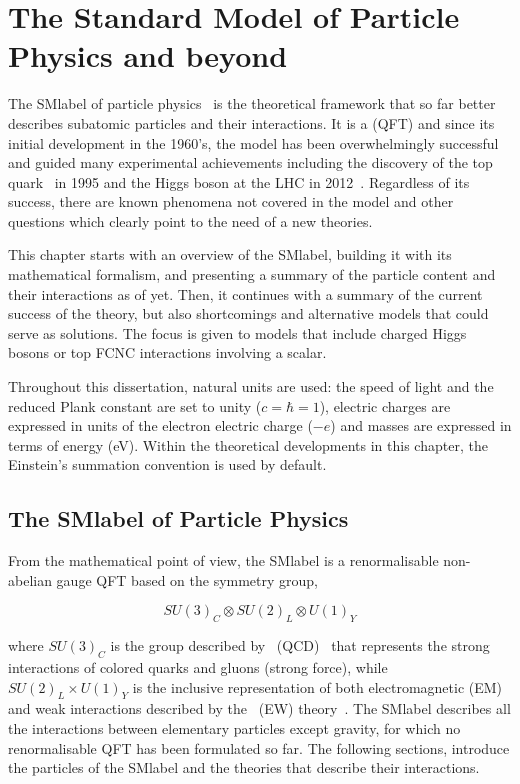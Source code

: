 \chapter{The Standard Model of Particle Physics and beyond}
\label{chapter:SM}

The \acrfull{SMlabel} of particle physics~\cite{PhysRevLett.19.1264,GLASHOW1961579,RevModPhys.52.525} is the theoretical framework
that so far better describes subatomic particles and their interactions.
It is a  (\acrshort{QFT}) and since its initial development in the 1960's,
the model has been overwhelmingly successful and guided many experimental achievements
including the discovery of the top quark~\cite{topsearch1995,PhysRevLett.74.2626} in 1995
and the Higgs boson at the LHC in 2012~\cite{ATLASHiggs2012,CMShiggs2012}.
Regardless of its success, there are known phenomena not covered in the model
and other questions which clearly point to the need of a new theories.

This chapter starts with an overview of the \acrshort{SMlabel}, building it with its mathematical formalism, and presenting a summary of the particle content and their interactions as of yet. Then, it continues with a summary of the current success of the theory, but also shortcomings and alternative models that could serve as solutions. The focus is given to models that include charged Higgs bosons or top FCNC interactions involving a scalar.

Throughout this dissertation, natural units are used: the speed of light and the reduced Plank constant are set to unity ($c=\hbar=1$),
electric charges are expressed in units of the electron electric charge ($-e$) and masses are expressed in terms of energy (eV).
Within the theoretical developments in this chapter, the Einstein's summation convention is used by default.

\section{The \acrlong{SMlabel} of Particle Physics}

From the mathematical point of view, the \acrshort{SMlabel} is a renormalisable non-abelian gauge \acrshort{QFT} based on the
symmetry group, 

\begin{equation}
    \label{Theory_eq:SMgroup}
    SU(3)_C\otimes SU(2)_L\otimes U(1)_Y
\end{equation}

where $SU(3)_C$ is the group described by ~(\acrshort{QCD})~\cite{QCD} that
represents the strong interactions of colored quarks and gluons (strong force),
while $SU(2)_L\times U(1)_Y$ is the inclusive representation of both electromagnetic (EM) and weak interactions
described by the ~(\acrshort{EW}) theory~\cite{PhysRevLett.19.1264,Salam:1968rm,GLASHOW1961579}. The \acrshort{SMlabel} describes all the interactions between elementary
particles except gravity, for which no renormalisable \acrshort{QFT} has been formulated so far.
The following sections, introduce the particles of the \acrshort{SMlabel} and the theories that describe their interactions.  

